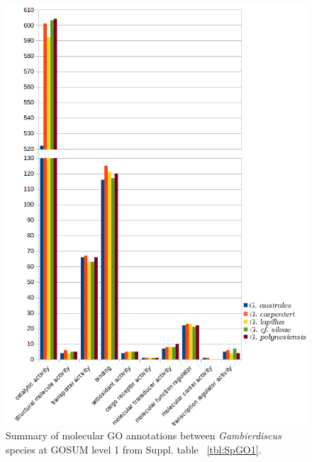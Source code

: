 \documentclass[12pt]{article}
\begin{document}
\begin{figure} 
\includegraphics[scale=1]{3Aug18_cluster-investigation/figures/gosum-species/Species-gosum1-molec-split.png} 
\caption{Summary of molecular GO annotations between \textit{Gambierdiscus} species at GOSUM level 1 from Suppl. table ~\ref{tbl:SpGO1}.} 
\label{fig:SpecGo1Molec}
\end{figure} 
\FloatBarrier
\end{document}
